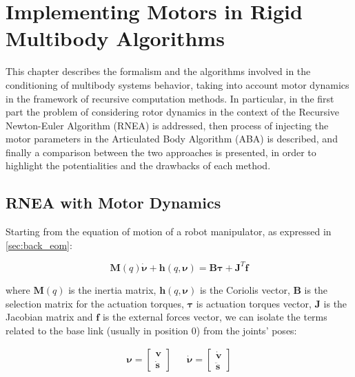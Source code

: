 \chapter{Implementing Motors in Rigid Multibody Algorithms}
\label{chp:contrib_ABA}

This chapter describes the formalism and the algorithms involved in the conditioning of multibody systems behavior, taking into account motor dynamics in the framework of recursive computation methods. In particular, in the first part the problem of considering rotor dynamics in the context of the Recursive Newton-Euler Algorithm (\ac{RNEA}) is addressed, then process of injecting the motor parameters in the Articulated Body Algorithm (\ac{ABA}) is described, and finally a comparison between the two approaches is presented, in order to highlight the potentialities and the drawbacks of each method.

\section{RNEA with Motor Dynamics}

Starting from the equation of motion of a robot manipulator, as expressed in \cref{sec:back_eom}:

\begin{equation}
    \mathbf{M}(q)\dot{\boldsymbol{\nu}} + \mathbf{h}(q,\boldsymbol{\nu}) = \mathbf{B}\boldsymbol{\tau} + \mathbf{J} ^T \mathbf{f}
\end{equation}

where $\mathbf{M}(q)$ is the inertia matrix, $\mathbf{h}(q,\boldsymbol{\nu})$ is the Coriolis vector, $\mathbf{B}$ is the selection matrix for the actuation torques, $\boldsymbol{\tau}$ is actuation torques vector, $\mathbf{J}$ is the Jacobian matrix and $\mathbf{f}$ is the external forces vector, we can isolate the terms related to the base link (usually in position 0) from the joints' poses:

\begin{align}
    \boldsymbol{\nu} =
    \begin{bmatrix}
        \mathrm{\mathbf{v}} \\
        \dot{\mathbf{s}}
    \end{bmatrix} &  &
    \dot{\boldsymbol{\nu}} =
    \begin{bmatrix}
        \dot{\mathrm{\mathbf{v}}} \\
        \ddot{\mathbf{s}}
    \end{bmatrix}
\end{align}

